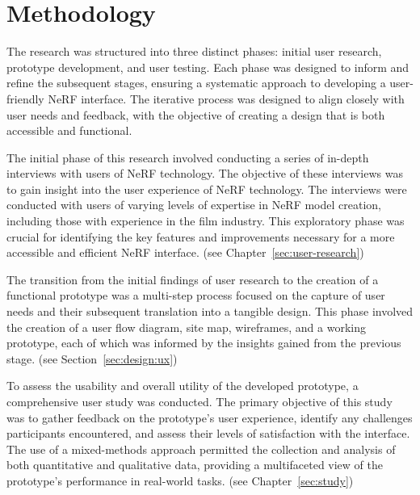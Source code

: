 %
\chapter{Methodology}
\label{sec:methodology}

The research was structured into three distinct phases: initial user research, prototype development, and user testing.
Each phase was designed to inform and refine the subsequent stages, ensuring a systematic approach to developing a user-friendly NeRF interface.
The iterative process was designed to align closely with user needs and feedback, with the objective of creating a design that is both accessible and functional.

The initial phase of this research involved conducting a series of in-depth interviews with users of NeRF technology.
The objective of these interviews was to gain insight into the user experience of NeRF technology.
The interviews were conducted with users of varying levels of expertise in NeRF model creation, including those with experience in the film industry.
This exploratory phase was crucial for identifying the key features and improvements necessary for a more accessible and efficient NeRF interface.
(see Chapter~\ref{sec:user-research})

The transition from the initial findings of user research to the creation of a functional prototype was a multi-step process focused on the capture of user needs and their subsequent translation into a tangible design.
This phase involved the creation of a user flow diagram, site map, wireframes, and a working prototype, each of which was informed by the insights gained from the previous stage.
(see Section~\ref{sec:design:ux})

To assess the usability and overall utility of the developed prototype, a comprehensive user study was conducted.
The primary objective of this study was to gather feedback on the prototype's user experience, identify any challenges participants encountered, and assess their levels of satisfaction with the interface.
The use of a mixed-methods approach permitted the collection and analysis of both quantitative and qualitative data, providing a multifaceted view of the prototype's performance in real-world tasks.
(see Chapter~\ref{sec:study})

